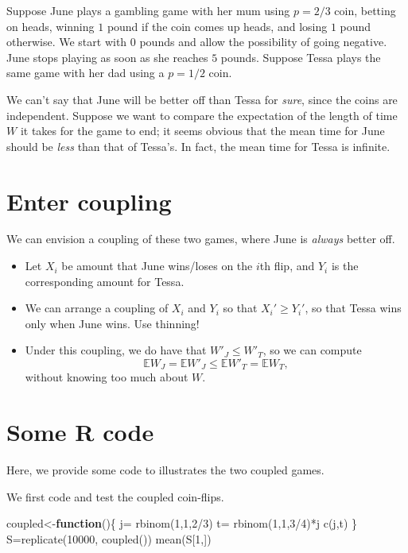 \documentclass[
]{article}
\newenvironment{Shaded}{\begin{snugshade}}{\end{snugshade}}
\newcommand{\ControlFlowTok}[1]{\textcolor[rgb]{0.13,0.29,0.53}{\textbf{#1}}}
\newcommand{\DecValTok}[1]{\textcolor[rgb]{0.00,0.00,0.81}{#1}}
\newcommand{\FunctionTok}[1]{\textcolor[rgb]{0.00,0.00,0.00}{#1}}
\newcommand{\NormalTok}[1]{#1}
\newcommand{\OtherTok}[1]{\textcolor[rgb]{0.56,0.35,0.01}{#1}}
\newcommand{\SpecialCharTok}[1]{\textcolor[rgb]{0.00,0.00,0.00}{#1}}
\theoremstyle{definition}
\theoremstyle{definition}
\theoremstyle{definition}
\theoremstyle{definition}
\theoremstyle{remark}
\begin{document}
Suppose June plays a gambling game with her mum using \(p=2/3\) coin, betting on heads, winning \(1\) pound if the coin comes up heads, and losing \(1\) pound otherwise. We start with \(0\) pounds and allow the possibility of going negative. June stops playing as soon as she reaches \(5\) pounds. Suppose Tessa plays the same game with her dad using a \(p=1/2\) coin.

We can't say that June will be better off than Tessa for \emph{sure}, since the coins are independent. Suppose we want to compare the expectation of the length of time \(W\) it takes for the game to end; it seems obvious that the mean time for June should be \emph{less} than that of Tessa's. In fact, the mean time for Tessa is infinite.

\hypertarget{enter-coupling}{%
\section{Enter coupling}\label{enter-coupling}}

We can envision a coupling of these two games, where June is \emph{always} better off.

\begin{itemize}
\item
  Let \(X_i\) be amount that June wins/loses on the \(i\)th flip, and \(Y_i\) is the corresponding amount for Tessa.
\item
  We can arrange a coupling of \(X_i\) and \(Y_i\) so that \(X_i' \geq Y_i'\), so that Tessa wins only when June wins. Use thinning!
\item
  Under this coupling, we do have that \(W'_J \leq W'_T\), so we can compute
  \[\mathbb{E} W_J = \mathbb{E} W'_J \leq \mathbb{E}  W'_T = \mathbb{E} W_T,\] without knowing too much about \(W\).
\end{itemize}

\hypertarget{some-r-code}{%
\section{Some R code}\label{some-r-code}}

Here, we provide some code to illustrates the two coupled games.

We first code and test the coupled coin-flips.

\begin{Shaded}
\begin{Highlighting}[]
\NormalTok{coupled}\OtherTok{\textless{}{-}}\ControlFlowTok{function}\NormalTok{()\{}
\NormalTok{  j}\OtherTok{=} \FunctionTok{rbinom}\NormalTok{(}\DecValTok{1}\NormalTok{,}\DecValTok{1}\NormalTok{,}\DecValTok{2}\SpecialCharTok{/}\DecValTok{3}\NormalTok{)}
\NormalTok{  t}\OtherTok{=} \FunctionTok{rbinom}\NormalTok{(}\DecValTok{1}\NormalTok{,}\DecValTok{1}\NormalTok{,}\DecValTok{3}\SpecialCharTok{/}\DecValTok{4}\NormalTok{)}\SpecialCharTok{*}\NormalTok{j}
\FunctionTok{c}\NormalTok{(j,t)}
\NormalTok{\}}
\NormalTok{S}\OtherTok{=}\FunctionTok{replicate}\NormalTok{(}\DecValTok{10000}\NormalTok{, }\FunctionTok{coupled}\NormalTok{())}
\FunctionTok{mean}\NormalTok{(S[}\DecValTok{1}\NormalTok{,])}
\end{Highlighting}
\end{Shaded}
\end{document}
